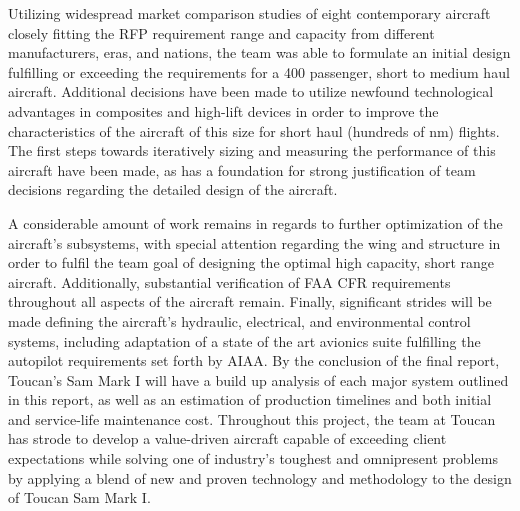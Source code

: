 Utilizing widespread market comparison studies of eight contemporary aircraft closely fitting the RFP requirement range and capacity from different manufacturers, eras, and nations, the team was able to formulate an initial design fulfilling or exceeding the requirements for a 400 passenger, short to medium haul aircraft. Additional decisions have been made to utilize newfound technological advantages in composites and high-lift devices in order to improve the characteristics of the aircraft of this size for short haul (hundreds of nm) flights.  The first steps towards iteratively sizing and measuring the performance of this aircraft have been made, as has a foundation for strong justification of team decisions regarding the detailed design of the aircraft.

A considerable amount of work remains in regards to further optimization of the aircraft's subsystems, with special attention regarding the wing and structure in order to fulfil the team goal of designing the optimal high capacity, short range aircraft.  Additionally, substantial verification of FAA CFR requirements throughout all aspects of the aircraft remain.  Finally, significant strides will be made defining the aircraft's hydraulic, electrical, and environmental control systems, including adaptation of a state of the art avionics suite fulfilling the autopilot requirements set forth by AIAA.  By the conclusion of the final report, Toucan's Sam Mark I will have a build up analysis of each major system outlined in this report, as well as an estimation of production timelines and both initial and service-life maintenance cost.  Throughout this project, the team at Toucan has strode to develop a value-driven aircraft capable of exceeding client expectations while solving one of industry's toughest and omnipresent problems by applying a blend of new and proven technology and methodology to the design of Toucan Sam Mark I.  



